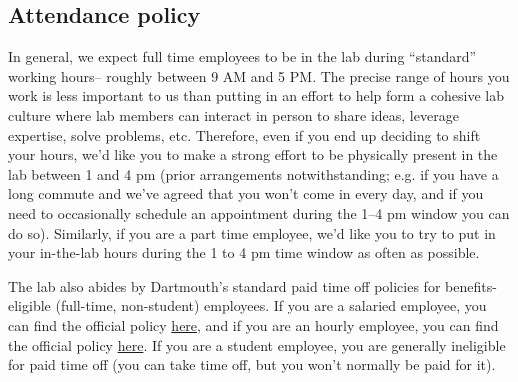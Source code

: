 \documentclass{tufte-book} %
\begin{document}
 \subsection{Attendance policy}
 In general, we expect full time employees to be in the lab during
 ``standard'' working hours-- roughly between 9 AM and 5 PM.  The
 precise range of hours you work is less important to us than putting
 in an effort to help form a cohesive lab culture where lab members
 can interact in person to share ideas, leverage expertise, solve
 problems, etc.  Therefore, even if you end up deciding to shift your
 hours, we'd like you to make a strong effort to be physically present
 in the lab between 1 and 4 pm (prior arrangements notwithstanding;
 e.g. if you have a long commute and we've agreed that you won't come
 in every day, and if you need to occasionally schedule an
 appointment during the 1--4 pm window you can do so).  Similarly, if
 you are a part time employee, we'd like you to try to put in your
 in-the-lab hours during the 1 to 4 pm time window as often as
 possible.

The lab also abides by Dartmouth's standard paid time off policies for
benefits-eligible (full-time, non-student) employees.  If you are a
salaried employee, you can find the official policy
\href{http://www.dartmouth.edu/~hrs/pdfs/paid_time_off_salaried.pdf}{here},
and if you are an hourly employee, you can find the official policy
\href{http://www.dartmouth.edu/~hrs/pdfs/Paid_Time_Off_Hourly.pdf}{here}.
If you are a student employee, you are generally ineligible for paid
time off (you can take time off, but you won't normally be paid for it).
\end{document}
